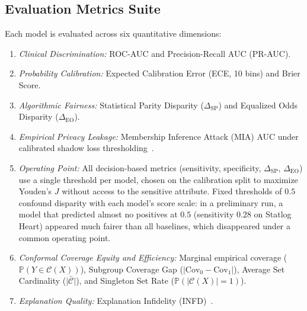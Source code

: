 \documentclass[3p,12pt]{elsarticle}
\theoremstyle{plain}
\theoremstyle{definition}
\begin{document}
\subsection{Evaluation Metrics Suite}
Each model is evaluated across six quantitative dimensions:
\begin{enumerate}
    \item \emph{Clinical Discrimination:} ROC-AUC and Precision-Recall AUC (PR-AUC).
    \item \emph{Probability Calibration:} Expected Calibration Error (ECE, 10 bins) and Brier Score.
    \item \emph{Algorithmic Fairness:} Statistical Parity Disparity ($\Delta_{\text{SP}}$) and Equalized Odds Disparity ($\Delta_{\text{EO}}$).
    \item \emph{Empirical Privacy Leakage:} Membership Inference Attack (MIA) AUC under calibrated shadow loss thresholding~\cite{shokri2017membership,yeom2018privacy,carlini2022membership}.
    \item \emph{Operating Point:} All decision-based metrics (sensitivity, specificity, $\Delta_{\text{SP}}$, $\Delta_{\text{EO}}$) use a single threshold per model, chosen on the calibration split to maximize Youden's $J$ without access to the sensitive attribute. Fixed thresholds of $0.5$ confound disparity with each model's score scale: in a preliminary run, a model that predicted almost no positives at $0.5$ (sensitivity $0.28$ on Statlog Heart) appeared much fairer than all baselines, which disappeared under a common operating point.
    \item \emph{Conformal Coverage Equity and Efficiency:} Marginal empirical coverage ($\mathbb{P}(Y \in \mathcal{C}(X))$), Subgroup Coverage Gap ($|\text{Cov}_0 - \text{Cov}_1|$), Average Set Cardinality ($\bar{|\mathcal{C}|}$), and Singleton Set Rate ($\mathbb{P}(|\mathcal{C}(X)| = 1)$).
    \item \emph{Explanation Quality:} Explanation Infidelity (INFD)~\cite{yeh2019infidelity}.
\end{enumerate}
\end{document}
